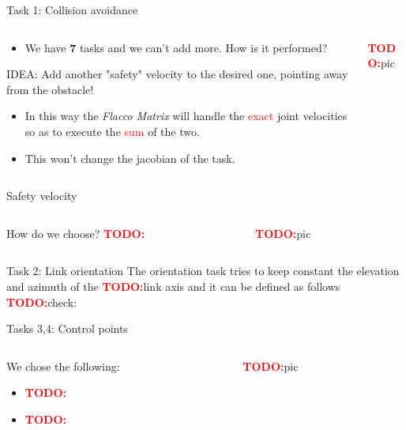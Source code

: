 \documentclass[11pt]{beamer}
\newcommand{\todo}{\textcolor{red}{\textbf{TODO:}}}
\begin{document}
\begin{frame}{Task 1: Collision avoidance}
\begin{columns}
\begin{column}{.5\textwidth}
\begin{itemize}
\item We have \textbf{7} tasks and we can't add more. How is it performed?
\end{itemize}
\begin{block}{IDEA:}
Add another "safety" velocity to the desired one, pointing away from the obstacle! 
\end{block}
\begin{itemize}
\item In this way the \emph{Flacco Matrix} will handle the \textcolor{red}{exact} joint velocities so as to execute the \textcolor{red}{sum} of the two.
\item This won't change the jacobian of the task.
\end{itemize}
\end{column}
\begin{column}{.5\textwidth}
\todo pic
\end{column}
\end{columns}
\end{frame}

\begin{frame}{Safety velocity}
\begin{columns}
\begin{column}{.5\textwidth}
How do we choose? \todo
\end{column}
\begin{column}{.5\textwidth}
\todo pic
\end{column}
\end{columns}
\end{frame}

\begin{frame}{Task 2: Link orientation}
The orientation task tries to keep constant the elevation and azimuth of the \todo link axis and it can be defined as follows \todo check:
\end{frame}

\begin{frame}{Tasks 3,4: Control points}
\begin{columns}
\begin{column}{.5\textwidth}
We chose the following:
\begin{itemize}
\item \todo
\item \todo
\end{itemize}
\end{column}
\begin{column}{.5\textwidth}
\todo pic
\end{column}
\end{columns}
\end{frame}
\end{document}
